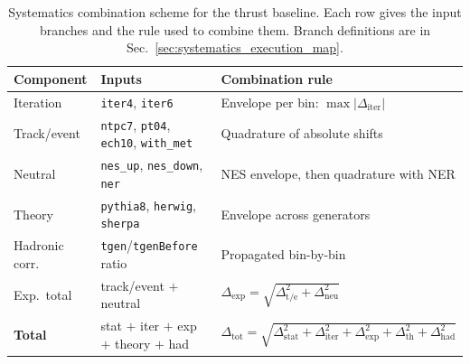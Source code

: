 
\begin{table}[ht!]
\centering
\small
\begin{tabular}{@{}p{} p{} p{}@{}}
\hline
Component & Inputs & Combination rule \\
\hline
Iteration &
  \texttt{iter4}, \texttt{iter6} &
  Envelope per bin: $\max|\Delta_{\mathrm{iter}}|$ \\
Track/event &
  \texttt{ntpc7}, \texttt{pt04}, \texttt{ech10}, \texttt{with\_met} &
  Quadrature of absolute shifts \\
Neutral &
  \texttt{nes\_up}, \texttt{nes\_down}, \texttt{ner} &
  NES envelope, then quadrature with NER \\
Theory &
  \texttt{pythia8}, \texttt{herwig}, \texttt{sherpa} &
  Envelope across generators \\
Hadronic corr. &
  \texttt{tgen}/\texttt{tgenBefore} ratio &
  Propagated bin-by-bin \\
\hline
Exp.\ total &
  track/event $+$ neutral &
  $\Delta_{\mathrm{exp}}=\sqrt{\Delta_{\mathrm{t/e}}^2+\Delta_{\mathrm{neu}}^2}$ \\
\textbf{Total} &
  stat $+$ iter $+$ exp $+$ theory $+$ had &
  $\Delta_{\mathrm{tot}}=\sqrt{\Delta_{\mathrm{stat}}^2+\Delta_{\mathrm{iter}}^2+\Delta_{\mathrm{exp}}^2+\Delta_{\mathrm{th}}^2+\Delta_{\mathrm{had}}^2}$ \\
\end{tabular}
\normalsize
\caption{Systematics combination scheme for the thrust baseline. Each row gives the input branches and the rule used to combine them. Branch definitions are in Sec.~\ref{sec:systematics_execution_map}.}
\label{fig:systematics_execution_chart}
\end{table}